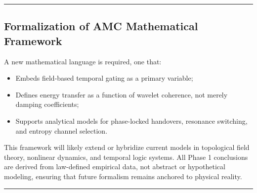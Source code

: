 \documentclass[10pt,aps,pre,onecolumn,superscriptaddress,notitlepage]{revtex4-2}
\begin{document}
\vspace{1em}
\hrule
\vspace{1em}

\subsection{Formalization of AMC Mathematical Framework}

A new mathematical language is required, one that:
\begin{itemize}
    \item Embeds field-based temporal gating as a primary variable;
    \item Defines energy transfer as a function of wavelet coherence, not merely damping coefficients;
    \item Supports analytical models for phase-locked handovers, resonance switching, and entropy channel selection.
\end{itemize}
This framework will likely extend or hybridize current models in topological field theory, nonlinear dynamics, and temporal logic systems. All Phase 1 conclusions are derived from law-defined empirical data, not abstract or hypothetical modeling, ensuring that future formalism remains anchored to physical reality. 
\vspace{1em}
\hrule
\vspace{1em}
\end{document}
